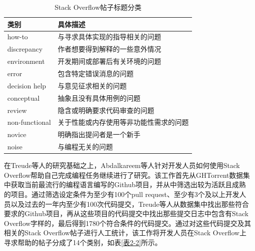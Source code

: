 \begin{table}[h]
    \centering
    \caption{Stack Overflow帖子标题分类\cite{DBLP:conf/icse/TreudeBS11}}
    \label{表2-1}
    \begin{tabular}{ll}
    \hline
    类别             & 具体描述                \\ \hline
    how-to         & 与寻求具体实现的指导相关的问题     \\
    discrepancy    & 作者想要得到解释的一些意外情况     \\
    environment    & 开发期间或部署后有关环境的问题     \\ 
    error          & 包含特定错误消息的问题         \\
    decision help  & 与意见征求相关的问题          \\
    conceptual     & 抽象且没有具体用例的问题        \\
    review         & 隐含或明确要求代码审查的问题      \\
    non-functional & 关于性能或内存使用等非功能性需求的问题 \\
    novice         & 明确指出提问者是一个新手        \\
    noise          & 与编程无关的问题          \\ \hline 
    \end{tabular}
\end{table}

在Treude等人的研究基础之上，Abdalkareem等人\cite{DBLP:journals/software/AbdalkareemSR17}针对开发人员如何使用Stack Overflow帮助自己完成编程任务继续进行了研究。该工作首先从GHTorrent数据集\cite{DBLP:conf/msr/Gousios13}中获取当前最流行的编程语言编写的Github项目，并从中筛选出较为活跃且成熟的项目。通过筛选设定条件为至少有100个pull request、至少有3个及以上开发人员以及过去的一年内至少有100次代码提交，Treude等人从数据集中找出那些符合要求的Github项目，再从这些项目的代码提交中找出那些提交日志中包含有Stack Overflow字样的，最后得到1780个符合条件的代码提交。通过对这些代码提交及其相关的Stack Overflow帖子进行人工统计，该工作将开发人员在Stack Overflow上寻求帮助的帖子分成了14个类别，如表\ref{表2-2}所示。


